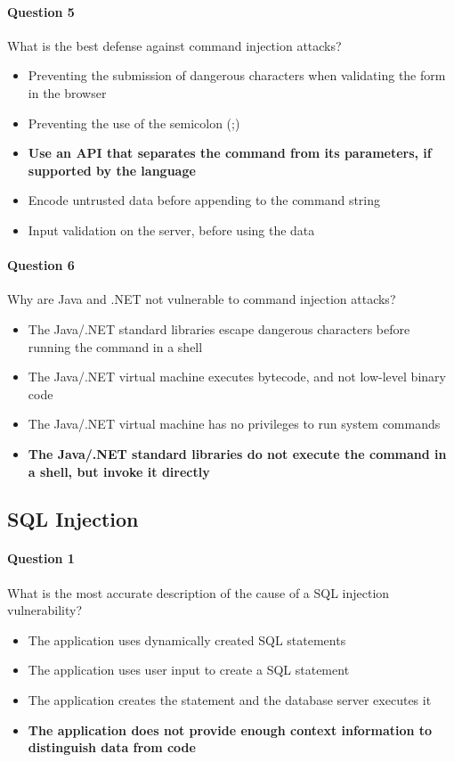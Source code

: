 \documentclass[titlepage]{article}
\begin{document}
    \paragraph{Question 5} What is the best defense against command injection attacks?
    \begin{itemize}
        \item Preventing the submission of dangerous characters when validating the form in the browser
        \item Preventing the use of the semicolon (;)
        \item \textbf{Use an API that separates the command from its parameters, if supported by the language} \checkmark
        \item Encode untrusted data before appending to the command string
        \item Input validation on the server, before using the data
    \end{itemize}
    \paragraph{Question 6} Why are Java and .NET not vulnerable to command injection attacks?
    \begin{itemize}
        \item The Java/.NET standard libraries escape dangerous characters before running the command in a shell
        \item The Java/.NET virtual machine executes bytecode, and not low-level binary code
        \item The Java/.NET virtual machine has no privileges to run system commands
        \item \textbf{The Java/.NET standard libraries do not execute the command in a shell, but invoke it directly} \checkmark
    \end{itemize}
    \subsection{SQL Injection}
    \paragraph{Question 1} What is the most accurate description of the cause of a SQL injection vulnerability?
    \begin{itemize}
        \item The application uses dynamically created SQL statements
        \item The application uses user input to create a SQL statement
        \item The application creates the statement and the database server executes it
        \item \textbf{The application does not provide enough context information to distinguish data from code} \checkmark
    \end{itemize}
\end{document}
